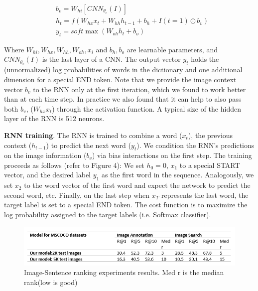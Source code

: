 \documentclass[12pt]{article}%
\begin{document}
\begin{align}
  & {{b}_{v}}={{W}_{hi}}[CN{{N}_{{{\theta }_{c}}}}(I)] \\ 
 & {{h}_{t}}=f({{W}_{hx}}{{x}_{t}}+{{W}_{hh}}{{h}_{t-1}}+{{b}_{h}}+I(t=1)\odot {{b}_{v}}) \\ 
 & {{y}_{t}}=soft\max ({{W}_{oh}}{{h}_{t}}+{{b}_{o}}) 
\end{align}

Where $W_{hi}, W_{hx}, W_{hh}, W_{oh}, x_i$ and $b_h, b_o$ are learnable parameters, and $CN{{N}_{{{\theta }_{c}}}}(I)$ is the last layer of a CNN. The output vector $y_t$ holds the (unnormalized) log probabilities of words in the dictionary and one additional dimension for a special END token. Note that we provide the image context vector $b_v$ to the RNN only at the first iteration, which we found to work better than at each time step. In practice we also found that it can help to also pass both $b_v$, ($W_{hx}x_t$) through the activation function. A typical size of the hidden layer of the RNN is 512 neurons.

{\bf RNN training}. The RNN is trained to combine a word ($x_t$), the previous context ($h_{t−1}$) to predict the next word ($y_t$). We condition the RNN’s predictions on the image information ($b_v$) via bias interactions on the first step. The training proceeds as follows (refer to Figure 4): We set  $h_0 = 0$, $x_1$ to a special START vector, and the desired label $y_1$ as the first word in the sequence. Analogously, we set $x_2$ to the word vector of the first word and expect the network to predict the second word, etc. Finally, on the last step when $x_T$ represents the last word, the target label is set to a special END token. The cost function is to maximize the log probability assigned to the target labels (i.e. Softmax classifier).

\begin{figure}[t]
\begin{center}
   \includegraphics[width=0.8\linewidth]{44.png}
\end{center}
   \caption{Image-Sentence ranking experiments results.  Med r is the median rank(low is good)}
\label{fig:circle}
\end{figure}
\end{document}
